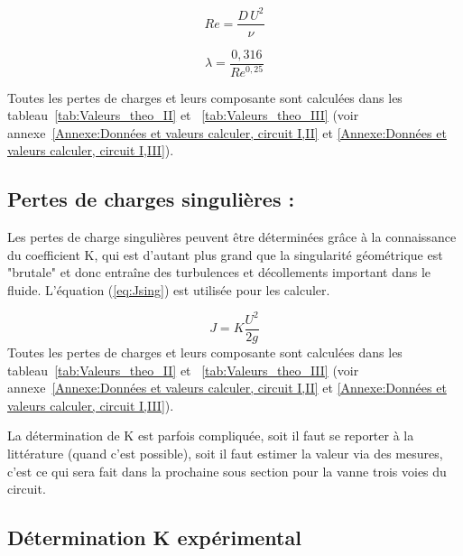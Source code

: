 \documentclass[12pt, a4paper, twoside]{article} %
\begin{document}
\begin{equation}
    Re=\frac{D\, U^{2}}{\nu}
    \label{eq:Re}
\end{equation}

\begin{equation}
    \lambda=\frac{0,316}{Re^{0,25}}
    \label{eq:lambda}
\end{equation}
 
 Toutes les pertes de charges et leurs composante sont calculées dans les tableau~\ref{tab:Valeurs_theo_II} et ~\ref{tab:Valeurs_theo_III} (voir annexe~\ref{Annexe:Données et valeurs calculer, circuit I,II} et \ref{Annexe:Données et valeurs calculer, circuit I,III}).  


\subsection{Pertes de charges singulières : }
Les pertes de charge singulières peuvent être déterminées grâce à la connaissance du coefficient K, qui est d'autant plus grand que la singularité géométrique est "brutale" et donc entraîne des turbulences et décollements important dans le fluide. L'équation (\ref{eq:Jsing}) est utilisée pour les calculer.

\begin{equation}
   J=K\frac{U^{2}}{2g}
    \label{eq:Jsing}
\end{equation}
 Toutes les pertes de charges et leurs composante sont calculées dans les tableau~\ref{tab:Valeurs_theo_II} et ~\ref{tab:Valeurs_theo_III} (voir annexe~\ref{Annexe:Données et valeurs calculer, circuit I,II} et \ref{Annexe:Données et valeurs calculer, circuit I,III}).  
 
La détermination de K est parfois compliquée, soit il faut se reporter à la littérature (quand c'est possible), soit il faut estimer la valeur via des mesures, c'est ce qui sera fait dans la prochaine sous section pour la vanne trois voies du circuit.



\subsection{Détermination K expérimental }
\end{document}

